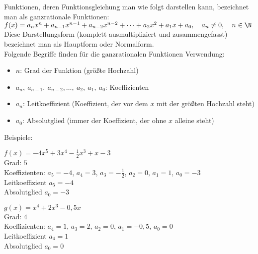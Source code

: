 Funktionen, deren Funktionsgleichung man wie folgt darstellen kann, bezeichnet man als ganzrationale Funktionen:\\
\(f(x)=a_nx^n+a_{n-1}x^{n-1}+a_{n-2}x^{n-2}+\dots +a_2x^2+a_1x+a_0, \quad a_n\neq 0, \quad n\in\N\)\\
Diese Darstellungsform (komplett ausmultipliziert und zusammengefasst) bezeichnet man als Hauptform oder Normalform.\\
Folgende Begriffe finden für die ganzrationalen Funktionen Verwendung:
\begin{itemize}\large
	\item[\textcolor{loes}{\textbullet}] \textcolor{loes}{\(n\): Grad der Funktion (größte Hochzahl)}
	\item[\textcolor{loes}{\textbullet}]  \textcolor{loes}{\(a_n,\ a_{n-1},\ a_{n-2}, \dots,\ a_2,\ a_1,\ a_0\): Koeffizienten}
	\item[\textcolor{loes}{\textbullet}]  \textcolor{loes}{\(a_n\): Leitkoeffizient (Koeffizient, der vor dem \(x\) mit der größten Hochzahl steht)}
	\item[\textcolor{loes}{\textbullet}]  \textcolor{loes}{\(a_0\): Absolutglied (immer der Koeffizient, der ohne \(x\) alleine steht)}
\end{itemize}\vspace{2cm}
Beispiele:\vspace{0.3cm}\\
\begin{minipage}{0.47\textwidth}\raggedright
	\(f(x)=-4x^5+3x^4-\frac{1}{2}x^3+x-3\)\\
	Grad: \(5\)\\
	Koeffizienten: \(a_5=-4\), \(a_4=3\), \(a_3=-\frac{1}{2}\), \(a_2=0\), \(a_1=1\), \(a_0=-3\)\\
	Leitkoeffizient \(a_5=-4\)\\
	Absolutglied \(a_0=-3\)
\end{minipage}\hfill
\begin{minipage}{0.47\textwidth}\raggedright
	\(g(x)=x^4+2x^3-0,5x\)\\
	Grad: \(4\)\\
	Koeffizienten: \(a_4=1\), \(a_3=2\), \(a_2=0\), \(a_1=-0,5\), \(a_0=0\)\\
	Leitkoeffizient \(a_4=1\)\\
	Absolutglied \(a_0=0\)
\end{minipage}
